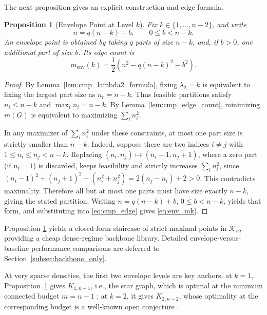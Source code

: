 \documentclass[letterpaper, 10 pt, conference]{ieeeconf}  %
\newtheorem{proposition}{Proposition}
\newcommand{\1}{\mathbf{1}}
\newcommand{\0}{\mathbf{0}}
\begin{document}
The next proposition gives an explicit construction and edge formula.
\begin{proposition}[Envelope Point at Level \(k\)]
\label{prop:env_formula}
Fix \(k\in\{1,\dots,n-2\}\), and write
\begin{equation}
n=q(n-k)+b,\qquad 0\le b<n-k.
\label{eq:env_division}
\end{equation}
An envelope point is obtained by taking \(q\) parts of size \(n-k\), and, if \(b>0\), one additional part of size \(b\).
Its edge count is
\begin{equation}
m_{\mathrm{env}}(k)=\frac{1}{2}\left(n^2-q(n-k)^2-b^2\right).
\label{eq:env_mk}
\end{equation}
\end{proposition}
\begin{proof}
By Lemma~\ref{lem:cmp_lambda2_formula}, fixing \(\lambda_2=k\) is equivalent to fixing the largest part size as \(n_r=n-k\).
Thus feasible partitions satisfy \(n_i\le n-k\) and \(\max_i n_i=n-k\).
By Lemma~\ref{lem:cmp_edge_count}, minimizing \(m(G)\) is equivalent to maximizing \(\sum_i n_i^2\).

In any maximizer of \(\sum_i n_i^2\) under these constraints, at most one part size is strictly smaller than \(n-k\).
Indeed, suppose there are two indices \(i\neq j\) with \(1\le n_i\le n_j<n-k\). Replacing \((n_i,n_j)\mapsto(n_i-1,n_j+1)\), where a zero part (if \(n_i=1\)) is discarded, keeps feasibility and strictly increases \(\sum_i n_i^2\), since \((n_i-1)^2+(n_j+1)^2-(n_i^2+n_j^2)=2(n_j-n_i)+2>0\).
This contradicts maximality.
Therefore all but at most one parts must have size exactly \(n-k\), giving the stated partition.
Writing \(n=q(n-k)+b\), \(0\le b<n-k\), yields that form, and substituting into \eqref{eq:cmp_edge} gives \eqref{eq:env_mk}.
\end{proof}

Proposition \ref{prop:env_formula} yields a closed-form staircase of strict-maximal points in \(\mathcal K_n\), providing a cheap dense-regime backbone library.
Detailed envelope-versus-baseline performance comparisons are deferred to Section~\ref{subsec:backbone_only}.

At very sparse densities, the first two envelope levels are key anchors: at \(k=1\), Proposition~\ref{prop:env_formula} gives \(K_{1,n-1}\), i.e., the star graph, which is optimal at the minimum connected budget \(m=n-1\) \cite{Mohar91}; at \(k=2\), it gives \(K_{2,n-2}\), whose optimality at the corresponding budget is a well-known open conjecture \cite{Kolokolnikov15}.
\end{document}
